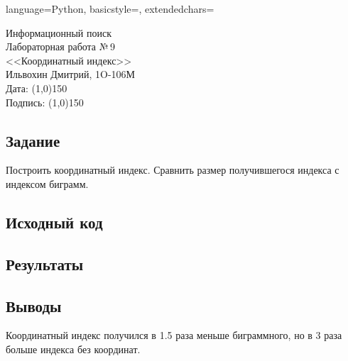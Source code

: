 \documentclass[12pt]{article}
\newcommand{\StudentName}{Ильвохин Дмитрий}
\newcommand{\Group}{1O-106М}
\newcommand{\CourseName}{Информационный поиск}
\newcommand{\LabNum}{9}
\newcommand{\Subject}{Координатный индекс}
\begin{document}
\lstset
{
        language=Python,
        basicstyle=\footnotesize,%
        extendedchars=\true
}

\begin{flushright}
\Large{
	\CourseName \\
	Лабораторная работа №\,\LabNum \\
	<<\Subject>> \\
  \StudentName, \Group \\
  Дата: \line(1,0){150} \\
  Подпись: \line(1,0){150} \\
}
\end{flushright}

\subsection*{Задание}
Построить координатный индекс.
Сравнить размер получившегося индекса с индексом биграмм.

\subsection*{Исходный код}



\subsection*{Результаты}


\subsection*{Выводы}
Координатный индекс получился в 1.5 раза меньше биграммного,
но в 3 раза больше индекса без координат.
\end{document}
